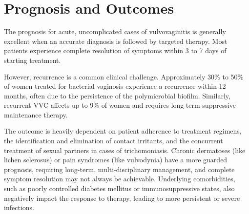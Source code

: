 \section*{Prognosis and Outcomes}
The prognosis for acute, uncomplicated cases of vulvovaginitis is generally excellent when an accurate diagnosis is followed by targeted therapy. Most patients experience complete resolution of symptoms within 3 to 7 days of starting treatment.

However, recurrence is a common clinical challenge. Approximately 30\% to 50\% of women treated for bacterial vaginosis experience a recurrence within 12 months, often due to the persistence of the polymicrobial biofilm. Similarly, recurrent VVC affects up to 9\% of women and requires long-term suppressive maintenance therapy.

The outcome is heavily dependent on patient adherence to treatment regimens, the identification and elimination of contact irritants, and the concurrent treatment of sexual partners in cases of trichomoniasis. Chronic dermatoses (like lichen sclerosus) or pain syndromes (like vulvodynia) have a more guarded prognosis, requiring long-term, multi-disciplinary management, and complete symptom resolution may not always be achievable. Underlying comorbidities, such as poorly controlled diabetes mellitus or immunosuppressive states, also negatively impact the response to therapy, leading to more persistent or severe infections.


